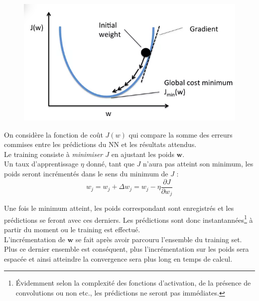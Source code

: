 \documentclass[a4paper,12pt]{report}
\numberwithin{equation}{section} %
\begin{document}
\begin{figure} 
\vspace{-15pt}
\centering
\includegraphics[scale=0.5]{GD_climb.png}
\end{figure}

\noindent On considère la fonction de coût $J(w)$ qui compare la somme des erreurs commises entre les prédictions du NN et les résultats attendus.\\
Le training consiste à \textit{minimiser $J$} en ajustant les poids $\textbf{w}$. \\ Un taux d'apprentissage $\eta$ donné, tant que $J$ n'aura pas atteint son minimum, les poids seront incrémentés dans le sens du minimum de $J$ :
$$w_j = w_j + \Delta w_j = w_j - \eta \frac{\partial J }{\partial w_j} $$ 

\noindent Une fois le minimum atteint, les poids correspondant sont enregistrés et les prédictions se feront avec ces derniers. Les prédictions sont donc instantannées\footnote{Évidemment selon la complexité des fonctions d'activation, de la présence de convolutions ou non etc., les prédictions ne seront pas immédiates. } à partir du moment ou le training est effectué.\\
L'incrémentation de $\textbf{w}$ se fait après avoir parcouru l'ensemble du training set. Plus ce dernier ensemble est conséquent, plus l'incrémentation sur les poids sera espacée et ainsi atteindre la convergence sera plus long en temps de calcul.
\end{document}
